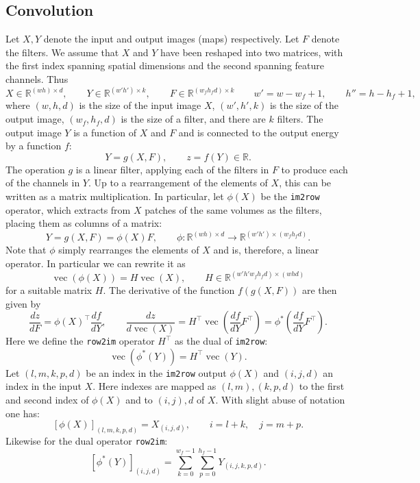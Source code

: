 \documentclass[12pt]{article}
\newcommand{\real}{\mathbb{R}}
\newcommand{\vv}{\operatorname{vec}}
\begin{document}
\subsection{Convolution}\label{s:convolution}

Let $X,Y$ denote the input and output images (maps) respectively. Let $F$ denote the filters. We assume that $X$ and $Y$ have been reshaped into two matrices, with the first index spanning spatial dimensions and the second spanning feature channels. Thus
\[
 X\in\real^{(wh) \times d}, \qquad
 Y\in\real^{(w'h') \times k}, \qquad
 F\in\real^{(w_fh_fd) \times k}
 \qquad
 w' = w - w_f + 1,
 \qquad
 h'' = h - h_f + 1,
\]
where $(w,h,d)$ is the size of the input image $X$, $(w',h',k)$ is the size of the output image, $(w_f,h_f,d)$ is the size of a filter, and there are $k$ filters. The output image $Y$ is a function of $X$ and $F$ and is connected to the output energy by a function $f$:
\[
Y = g(X,F),
\qquad
z = f(Y) \in \real.
\]
The operation $g$ is a linear filter, applying each of the filters in $F$ to produce each of the channels in $Y$. Up to a rearrangement of the elements of $X$, this can be written as a matrix multiplication. In particular, let $\phi(X)$ be the {\tt im2row} operator, which extracts from $X$ patches of the same volumes as the filters, placing them as columns of a matrix:
\[
 Y = g(X,F) = \phi(X) F,\qquad 
 \phi: \real^{(wh)\times d} \rightarrow \real^{(w'h')\times(w_fh_fd)}.
\]
Note that $\phi$ simply rearranges the elements of $X$ and is, therefore, a linear operator. In particular we can rewrite it as
\[
 \vv(\phi(X)) = H \vv(X), \qquad H \in \real^{(w'h'w_fh_fd) \times (whd)}
\]
for a suitable matrix $H$. The derivative of the function $f(g(X,F))$ are then given by
\[
\boxed{
\frac{dz}{dF}
=
\phi(X)^\top\frac{d f}{d Y},
\qquad
\frac{d z}{d \vv(X)}
=
H^\top
\vv\left(
\frac{d f}{d Y}F^\top
\right)
=
\phi^*\left(
\frac{d f}{d Y}F^\top
\right).
}
\]
Here we define the {\tt row2im} operator $H^\top$ as the dual of {\tt im2row}:
\[
 \vv(\phi^*(Y)) = H^\top \vv(Y).
\]
Let $(l,m,k,p,d)$ be an index in the {\tt im2row} output $\phi(X)$ and $(i,j,d)$ an index in the input $X$. Here indexes are mapped as $(l,m),(k,p,d)$ to the first and second index of $\phi(X)$ and to $(i,j),d$ of $X$. With slight abuse of notation one has:
\[
   [\phi(X)]_{(l,m,k,p,d)}= X_{(i,j,d)}, \qquad i=l+k,\quad j=m+p.
\]
Likewise for the dual operator {\tt row2im}:
\[
   [\phi^*(Y)]_{(i,j,d)} 
   = \sum_{k=0}^{w_f-1} \sum_{p=0}^{h_f-1} Y_{(i,j,k,p,d)}.
\]
\end{document}
